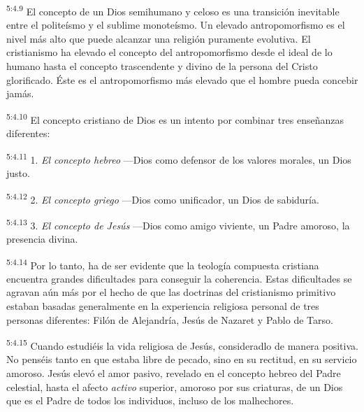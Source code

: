 \par
\textsuperscript{5:4.9} El concepto de un Dios semihumano y celoso es una transición inevitable entre el politeísmo y el sublime monoteísmo. Un elevado antropomorfismo es el nivel más alto que puede alcanzar una religión puramente evolutiva. El cristianismo ha elevado el concepto del antropomorfismo desde el ideal de lo humano hasta el concepto trascendente y divino de la persona del Cristo glorificado. Éste es el antropomorfismo más elevado que el hombre pueda concebir jamás.

\par
\textsuperscript{5:4.10} El concepto cristiano de Dios es un intento por combinar tres enseñanzas diferentes:

\par
\textsuperscript{5:4.11} 1. \textit{El concepto hebreo} ---Dios como defensor de los valores morales, un Dios justo.

\par
\textsuperscript{5:4.12} 2. \textit{El concepto griego} ---Dios como unificador, un Dios de sabiduría.

\par
\textsuperscript{5:4.13} 3. \textit{El concepto de Jesús} ---Dios como amigo viviente, un Padre amoroso, la presencia divina.

\par
\textsuperscript{5:4.14} Por lo tanto, ha de ser evidente que la teología compuesta cristiana encuentra grandes dificultades para conseguir la coherencia. Estas dificultades se agravan aún más por el hecho de que las doctrinas del cristianismo primitivo estaban basadas generalmente en la experiencia religiosa personal de tres personas diferentes: Filón de Alejandría, Jesús de Nazaret y Pablo de Tarso.

\par
\textsuperscript{5:4.15} Cuando estudiéis la vida religiosa de Jesús, consideradlo de manera positiva. No penséis tanto en que estaba libre de pecado, sino en su rectitud, en su servicio amoroso. Jesús elevó el amor pasivo, revelado en el concepto hebreo del Padre celestial, hasta el afecto \textit{activo} superior, amoroso por sus criaturas, de un Dios que es el Padre de todos los individuos, incluso de los malhechores.

